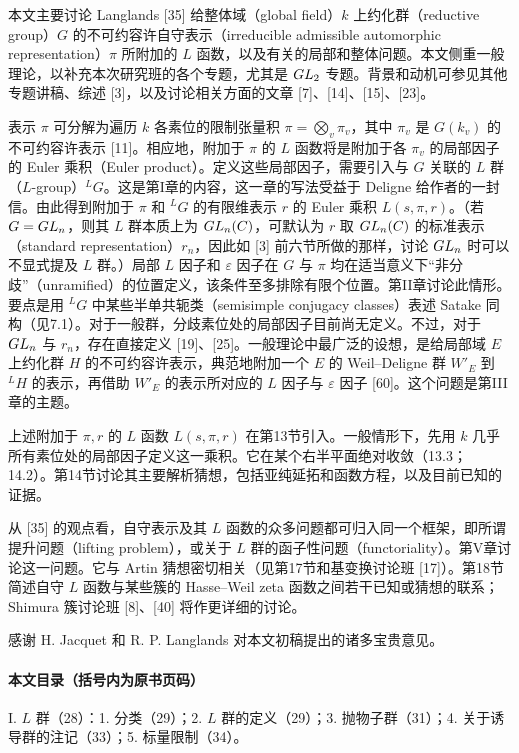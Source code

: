 本文主要讨论 Langlands [35] 给整体域（global field）$k$ 上约化群（reductive group）$G$ 的不可约容许自守表示（irreducible admissible automorphic representation）$\pi$ 所附加的 $L$ 函数，以及有关的局部和整体问题。本文侧重一般理论，以补充本次研究班的各个专题，尤其是 $GL_2$ 专题。背景和动机可参见其他专题讲稿、综述 [3]，以及讨论相关方面的文章 [7]、[14]、[15]、[23]。

表示 $\pi$ 可分解为遍历 $k$ 各素位的限制张量积 $\pi=\bigotimes_v\pi_v$，其中 $\pi_v$ 是 $G(k_v)$ 的不可约容许表示 [11]。相应地，附加于 $\pi$ 的 $L$ 函数将是附加于各 $\pi_v$ 的局部因子的 Euler 乘积（Euler product）。定义这些局部因子，需要引入与 $G$ 关联的 $L$ 群（$L$-group）${}^LG$。这是第I章的内容，这一章的写法受益于 Deligne 给作者的一封信。由此得到附加于 $\pi$ 和 ${}^LG$ 的有限维表示 $r$ 的 Euler 乘积 $L(s,\pi,r)$。（若 $G=GL_n$，则其 $L$ 群本质上为 $GL_n(C)$，可默认为 $r$ 取 $GL_n(C)$ 的标准表示（standard representation）$r_n$，因此如 [3] 前六节所做的那样，讨论 $GL_n$ 时可以不显式提及 $L$ 群。）局部 $L$ 因子和 $\varepsilon$ 因子在 $G$ 与 $\pi$ 均在适当意义下“非分歧”（unramified）的位置定义，该条件至多排除有限个位置。第II章讨论此情形。要点是用 ${}^LG$ 中某些半单共轭类（semisimple conjugacy classes）表述 Satake 同构（见7.1）。对于一般群，分歧素位处的局部因子目前尚无定义。不过，对于 $GL_n$ 与 $r_n$，存在直接定义 [19]、[25]。一般理论中最广泛的设想，是给局部域 $E$ 上约化群 $H$ 的不可约容许表示，典范地附加一个 $E$ 的 Weil--Deligne 群 $W'_E$ 到 ${}^LH$ 的表示，再借助 $W'_E$ 的表示所对应的 $L$ 因子与 $\varepsilon$ 因子 [60]。这个问题是第III章的主题。

上述附加于 $\pi,r$ 的 $L$ 函数 $L(s,\pi,r)$ 在第13节引入。一般情形下，先用 $k$ 几乎所有素位处的局部因子定义这一乘积。它在某个右半平面绝对收敛（13.3；14.2）。第14节讨论其主要解析猜想，包括亚纯延拓和函数方程，以及目前已知的证据。

从 [35] 的观点看，自守表示及其 $L$ 函数的众多问题都可归入同一个框架，即所谓提升问题（lifting problem），或关于 $L$ 群的函子性问题（functoriality）。第V章讨论这一问题。它与 Artin 猜想密切相关（见第17节和基变换讨论班 [17]）。第18节简述自守 $L$ 函数与某些簇的 Hasse--Weil zeta 函数之间若干已知或猜想的联系；Shimura 簇讨论班 [8]、[40] 将作更详细的讨论。

感谢 H. Jacquet 和 R. P. Langlands 对本文初稿提出的诸多宝贵意见。

\paragraph*{本文目录（括号内为原书页码）}
I. $L$ 群（28）：1. 分类（29）；2. $L$ 群的定义（29）；3. 抛物子群（31）；4. 关于诱导群的注记（33）；5. 标量限制（34）。


